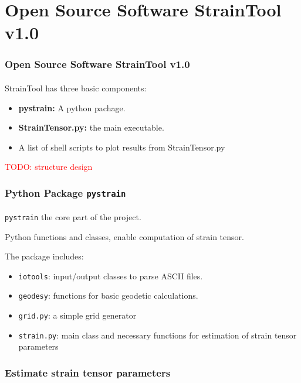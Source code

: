 \section{Open Source Software \textbf{StrainTool v1.0}}
 

\begin{frame}
  \frametitle{Open Source Software \textbf{StrainTool v1.0}}
  \framesubtitle{}
  \label{ch2:straintool}
  
  StrainTool has three basic components:
  \begin{itemize}
    \item \textbf{pystrain:} A python pachage.
    \item \textbf{StrainTensor.py:} the main executable.
    \item A list of shell scripts to plot results from StrainTensor.py
  \end{itemize}
  \textcolor{red}{TODO: structure design}
  
\end{frame}
\note{}


\begin{frame}
  \frametitle{Python Package \texttt{pystrain}}
  \framesubtitle{}
  \label{ch2:}
  
  \texttt{pystrain} the core part of the project.
  
  Python functions and classes, enable computation of strain tensor.
  
  The package includes:
  \begin{itemize}
    \item \texttt{iotools}: input/output classes to parse ASCII files.
    \item \texttt{geodesy}: functions for basic geodetic calculations.
    \item \texttt{grid.py}: a simple grid generator
    \item \texttt{strain.py}: main class and necessary functions for estimation of strain  tensor parameters
  \end{itemize}
  
  

\end{frame}
\note{}


\begin{frame}
 \frametitle{Estimate strain tensor parameters}
 \framesubtitle{}
 \label{ch2:}

\end{frame}
\note{}

